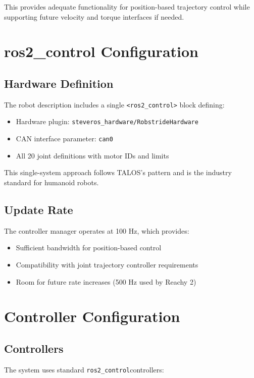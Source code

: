 \documentclass[12pt,a4paper]{article}
\newcommand{\code}[1]{\texttt{#1}}
\newcommand{\rc}{\code{ros2\_control}}
\begin{document}
This provides adequate functionality for position-based trajectory control while 
supporting future velocity and torque interfaces if needed.

\section{ros2\_control Configuration}

\subsection{Hardware Definition}
The robot description includes a single \code{<ros2\_control>} block defining:

\begin{itemize}
    \item Hardware plugin: \code{steveros\_hardware/RobstrideHardware}
    \item CAN interface parameter: \code{can0}
    \item All 20 joint definitions with motor IDs and limits
\end{itemize}

This single-system approach follows TALOS's pattern and is the industry standard 
for humanoid robots.

\subsection{Update Rate}
The controller manager operates at 100 Hz, which provides:

\begin{itemize}
    \item Sufficient bandwidth for position-based control
    \item Compatibility with joint trajectory controller requirements
    \item Room for future rate increases (500 Hz used by Reachy 2)
\end{itemize}

\section{Controller Configuration}

\subsection{Controllers}
The system uses standard \rc controllers:
\end{document}
